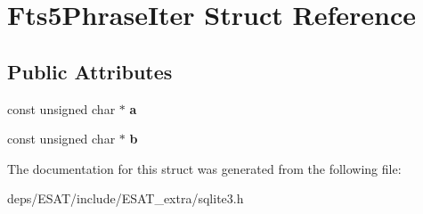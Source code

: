 \hypertarget{struct_fts5_phrase_iter}{}\section{Fts5\+Phrase\+Iter Struct Reference}
\label{struct_fts5_phrase_iter}
\subsection*{Public Attributes}
\begin{DoxyCompactItemize}
\item 
\mbox{\label{struct_fts5_phrase_iter_a335969d1ac0fcbb94173c472a3f179ae}} 
const unsigned char $\ast$ {\bfseries a}
\item 
\mbox{\label{struct_fts5_phrase_iter_a459180b0d670604aa38b3ac94be6adda}} 
const unsigned char $\ast$ {\bfseries b}
\end{DoxyCompactItemize}


The documentation for this struct was generated from the following file\+:\begin{DoxyCompactItemize}
\item 
deps/\+E\+S\+A\+T/include/\+E\+S\+A\+T\+\_\+extra/sqlite3.\+h\end{DoxyCompactItemize}
